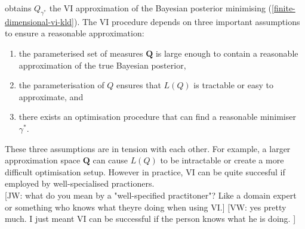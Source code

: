 \documentclass{article}
\newcommand{\jw}[1]{{\color{gray} [JW: #1]}}
\newcommand{\vw}[1]{{\color{green} [VW: #1]}}
\numberwithin{equation}{section}
\begin{document}
obtains $Q_{\gamma^*}$ the VI approximation of the Bayesian posterior minimising (\ref{finite-dimensional-vi-kld}). The VI procedure depends on three important assumptions to ensure a reasonable approximation:
\begin{enumerate}
    \item the parameterised set of measures $\boldsymbol{Q}$ is large enough to contain a reasonable approximation of the true Bayesian posterior,
    \item the parameterisation of $Q$ ensures that $L(Q)$ is tractable or easy to approximate, and
    \item there exists an optimisation procedure that can find a reasonable minimiser $\gamma^*$.
\end{enumerate}
These three assumptions are in tension with each other.
For example, a larger approximation space $\boldsymbol{Q}$ can cause $L(Q)$ to be intractable or create a more difficult optimisation setup.
However in practice, VI can be quite succesful if employed by well-specialised practioners.
\\\jw{what do you mean by a "well-specified practitoner"? Like a domain expert or something who knows what theyre doing when using VI.}
\vw{yes pretty much. I just meant VI can be successful if the person knows what he is doing. }
\end{document}
